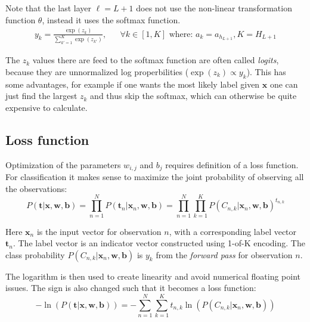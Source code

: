 Note that the last layer $\ell = L + 1$ does not use the non-linear transformation function $\theta$, instead it uses the softmax function.
\begin{equation}
\begin{aligned}
y_k = \frac{\exp(z_k)}{\sum_{k'=1}^K \exp(z_{k'})}, && \forall k \in [1, K] \text{ where: } a_k=a_{h_{L+1}}, K = H_{L + 1}
\end{aligned}
\label{eq:theory:ffnn:y}
\end{equation}

The $z_k$ values there are feed to the softmax function are often called \textit{logits}, because they are unnormalized log properbilities ($\exp(z_k) \propto y_k$). This has some advantages, for example if one wants the most likely label given $\mathbf{x}$ one can just find the largest $z_k$ and thus skip the softmax, which can otherwise be quite expensive to calculate.

\subsection{Loss function}

Optimization of the parameters $w_{i,j}$ and $b_{j}$ requires definition of a loss function. For classification it makes sense to maximize the joint probability of observing all the observations:
\begin{equation}
P(\mathbf{t} | \mathbf{x}, \mathbf{w}, \mathbf{b}) = \prod_{n=1}^N P(\mathbf{t}_n | \mathbf{x}_n, \mathbf{w}, \mathbf{b})  = \prod_{n=1}^N \prod_{k=1}^K P(C_{n, k} | \mathbf{x}_n, \mathbf{w}, \mathbf{b})^{t_{n, k}}
\end{equation}

Here $\mathbf{x}_{n}$ is the input vector for observation $n$, with a corresponding label vector $\mathbf{t}_n$. The label vector is an indicator vector constructed using 1-of-K encoding. The class probability $P(C_{n, k} | \mathbf{x}_n, \mathbf{w}, \mathbf{b})$ is $y_k$ from the \textit{forward pass} for observation $n$.

The logarithm is then used to create linearity and avoid numerical floating point issues. The sign is also changed such that it becomes a loss function:
\begin{equation}
- \ln\left(P(\mathbf{t} | \mathbf{x}, \mathbf{w}, \mathbf{b})\right) = - \sum_{n=1}^N \sum_{k=1}^K t_{n, k} \ln\left( P(C_{n, k} | \mathbf{x}_n, \mathbf{w}, \mathbf{b})\right)
\label{eq:theory:ffnn:long-loss}
\end{equation}

